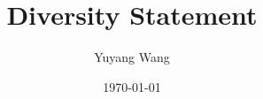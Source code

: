 



\title{Diversity Statement}
\def\rsCustom{%
    \kant[6]\cite{wangScalableArchitectureSubpJ2023}
}

\author{Yuyang Wang}
\date{\today}
\makeatletter
\fancyfoot[L]{\scshape \MakeLowercase{\@author}}
\fancyfoot[R]{{\scshape \MakeLowercase{\@title}}\quad{\fontsize{16}{20}\selectfont\sfrac{\thepage}{\pageref*{LastPage}}}\hspace{0.25in}}
\makeatother



\maketitle%


\rsCustom{}

\footnotesize


